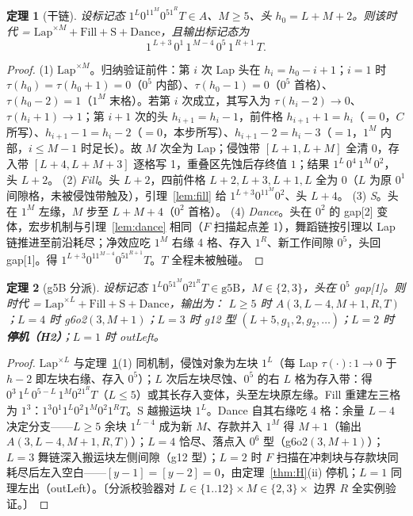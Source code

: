 \documentclass[11pt]{ctexart}
\newtheorem{theorem}{定理}[section]
\begin{document}
\begin{theorem}[干链]\label{thm:dry}
设标记态 $1^L0^11^M0^51^RT\in A$、$M\ge5$、头 $h_0=L{+}M{+}2$。则该时代 = $\mathrm{Lap}^{\times M}+\mathrm{Fill}+\mathrm S+\mathrm{Dance}$，且输出标记态为
\[
1^{\,L+3}\,0^1\,1^{\,M-4}\,0^5\,1^{\,R+1}\,T .
\]
\end{theorem}
\begin{proof}
(1) \emph{$\mathrm{Lap}^{\times M}$}。归纳验证前件：第 $i$ 次 Lap 头在 $h_i=h_0-i+1$；$i=1$ 时 $\tau(h_0)=\tau(h_0{+}1)=0$（$0^5$ 内部）、$\tau(h_0{-}1)=0$（$0^5$ 首格）、$\tau(h_0{-}2)=1$（$1^M$ 末格）。若第 $i$ 次成立，其写入为 $\tau(h_i{-}2)\to0$、$\tau(h_i{+}1)\to1$；第 $i{+}1$ 次的头 $h_{i+1}=h_i-1$，前件格 $h_{i+1}{+}1=h_i$（$=0$，$C$ 所写）、$h_{i+1}{-}1=h_i{-}2$（$=0$，本步所写）、$h_{i+1}{-}2=h_i{-}3$（$=1$，$1^M$ 内部，$i\le M-1$ 时足长）。故 $M$ 次全为 Lap；侵蚀带 $[L{+}1,L{+}M]$ 全清 0，存入带 $[L{+}4,L{+}M{+}3]$ 逐格写 1，重叠区先蚀后存终值 $1$；结果 $1^L\,0^4\,1^M\,0^2$，头 $L{+}2$。
(2) \emph{Fill}。头 $L{+}2$，四前件格 $L{+}2,L{+}3,L{+}1,L$ 全为 $0$（$L$ 为原 $0^1$ 间隙格，未被侵蚀带触及），引理~\ref{lem:fill} 给 $1^{L+3}0^11^M0^2$、头 $L{+}4$。
(3) \emph{S}。头在 $1^M$ 左缘，$M$ 步至 $L{+}M{+}4$（$0^2$ 首格）。
(4) \emph{Dance}。头在 $0^2$ 的 gap[2] 变体，宏步机制与引理~\ref{lem:dance} 相同（$F$ 扫描起点差 1），舞蹈链按引理以 Lap 链推进至前沿耗尽；净效应吃 $1^M$ 右缘 4 格、存入 $1^R$、新工作间隙 $0^5$，头回 gap[1]。得 $1^{L+3}0^11^{M-4}0^51^{R+1}T$。$T$ 全程未被触碰。
\end{proof}

\begin{theorem}[g5B 分派]\label{thm:D1}
设标记态 $1^L0^51^M0^21^RT\in\mathrm{g5B}$，$M\in\{2,3\}$，头在 $0^5$ gap[1]。则时代 = $\mathrm{Lap}^{\times L}+\mathrm{Fill}+\mathrm S+\mathrm{Dance}$，输出为：
$L\ge5$ 时 $A(3,L{-}4,M{+}1,R,T)$；$L=4$ 时 g6o2$(3,M{+}1)$；$L=3$ 时 g12 型 $(L{+}5,g_1,2,g_2,\dots)$；$L=2$ 时 \textbf{停机（H2）}；$L=1$ 时 outLeft。
\end{theorem}
\begin{proof}
$\mathrm{Lap}^{\times L}$ 与定理~\ref{thm:dry}(1) 同机制，侵蚀对象为左块 $1^L$（每 Lap $\tau(\cdot)\colon 1\to0$ 于 $h{-}2$ 即左块右缘、存入 $0^5$）；$L$ 次后左块尽蚀、$0^5$ 的右 $L$ 格为存入带：得 $0^3\,1^L\,0^{5-L}\,1^M0^21^RT$（$L\le5$）或其长存入变体，头至左块原左缘。Fill 重建左三格为 $1^3$：$1^3 0^1 1^L 0^2 1^M 0^2 1^RT$。S 越搬运块 $1^L$。Dance 自其右缘吃 4 格：余量 $L-4$ 决定分支——$L\ge5$ 余块 $1^{L-4}$ 成为新 $M$、存款并入 $1^M$ 得 $M{+}1$（输出 $A(3,L{-}4,M{+}1,R,T)$）；$L=4$ 恰尽、落点入 $0^6$ 型（g6o2$(3,M{+}1)$）；$L=3$ 舞链深入搬运块左侧间隙（g12 型）；$L=2$ 时 $F$ 扫描在冲刺块与存款块同耗尽后左入空白——$[y{-}1]=[y{-}2]=0$，由定理~\ref{thm:H}(ii) 停机；$L=1$ 同理左出（outLeft）。〔分派校验器对 $L\in\{1..12\}\times M\in\{2,3\}\times$ 边界 $R$ 全实例验证。〕
\end{proof}
\end{document}
